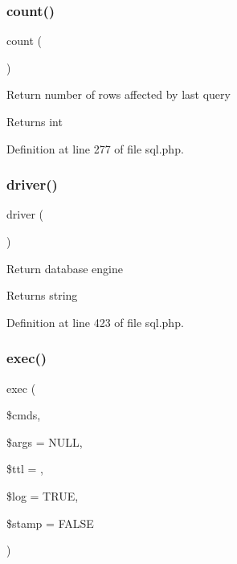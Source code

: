 \subsubsection{\texorpdfstring{count()}{count()}}
{\footnotesize\ttfamily count (\begin{DoxyParamCaption}{ }\end{DoxyParamCaption})}

Return number of rows affected by last query \begin{DoxyReturn}{Returns}
int 
\end{DoxyReturn}


Definition at line 277 of file sql.\+php.

\hypertarget{class_d_b_1_1_s_q_l_a050ad2e495e82f1399b484074dd4974d}{}\label{class_d_b_1_1_s_q_l_a050ad2e495e82f1399b484074dd4974d} 
\subsubsection{\texorpdfstring{driver()}{driver()}}
{\footnotesize\ttfamily driver (\begin{DoxyParamCaption}{ }\end{DoxyParamCaption})}

Return database engine \begin{DoxyReturn}{Returns}
string 
\end{DoxyReturn}


Definition at line 423 of file sql.\+php.

\hypertarget{class_d_b_1_1_s_q_l_a5fada1d189c38aeffb28fb712669309f}{}\label{class_d_b_1_1_s_q_l_a5fada1d189c38aeffb28fb712669309f} 
\subsubsection{\texorpdfstring{exec()}{exec()}}
{\footnotesize\ttfamily exec (\begin{DoxyParamCaption}\item[{}]{\$cmds,  }\item[{}]{\$args = {\ttfamily NULL},  }\item[{}]{\$ttl = {},  }\item[{}]{\$log = {\ttfamily TRUE},  }\item[{}]{\$stamp = {\ttfamily FALSE} }\end{DoxyParamCaption})}

